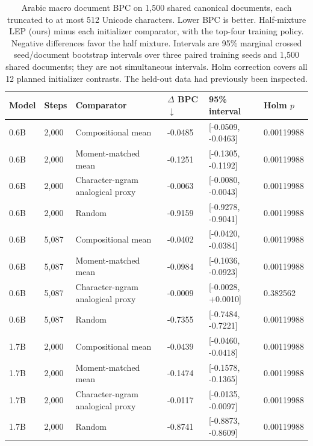 \begin{table}[t]
\centering
\small
\setlength{\tabcolsep}{4pt}
\begin{tabular}{@{}llllll@{}}
\toprule
Model & Steps & Comparator & $\Delta$ BPC $\downarrow$ & 95\% interval & Holm $p$ \\
\midrule
0.6B & 2,000 & Compositional mean & -0.0485 & [-0.0509, -0.0463] & 0.00119988 \\
0.6B & 2,000 & Moment-matched mean & -0.1251 & [-0.1305, -0.1192] & 0.00119988 \\
0.6B & 2,000 & Character-ngram analogical proxy & -0.0063 & [-0.0080, -0.0043] & 0.00119988 \\
0.6B & 2,000 & Random & -0.9159 & [-0.9278, -0.9041] & 0.00119988 \\
0.6B & 5,087 & Compositional mean & -0.0402 & [-0.0420, -0.0384] & 0.00119988 \\
0.6B & 5,087 & Moment-matched mean & -0.0984 & [-0.1036, -0.0923] & 0.00119988 \\
0.6B & 5,087 & Character-ngram analogical proxy & -0.0009 & [-0.0028, +0.0010] & 0.382562 \\
0.6B & 5,087 & Random & -0.7355 & [-0.7484, -0.7221] & 0.00119988 \\
1.7B & 2,000 & Compositional mean & -0.0439 & [-0.0460, -0.0418] & 0.00119988 \\
1.7B & 2,000 & Moment-matched mean & -0.1474 & [-0.1578, -0.1365] & 0.00119988 \\
1.7B & 2,000 & Character-ngram analogical proxy & -0.0117 & [-0.0135, -0.0097] & 0.00119988 \\
1.7B & 2,000 & Random & -0.8741 & [-0.8873, -0.8609] & 0.00119988 \\
\bottomrule
\end{tabular}
\caption{Arabic macro document BPC on 1,500 shared canonical documents, each truncated to at most 512 Unicode characters. Lower BPC is better. Half-mixture LEP (ours) minus each initializer comparator, with the top-four training policy. Negative differences favor the half mixture. Intervals are 95\% marginal crossed seed/document bootstrap intervals over three paired training seeds and 1,500 shared documents; they are not simultaneous intervals. Holm correction covers all 12 planned initializer contrasts. The held-out data had previously been inspected. }
\label{tab:rebuttal-initializer-inference}
\end{table}
